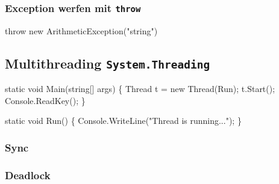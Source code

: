 \documentclass[
  9pt,
  a4paperpaper,
  DIV=11]{scrartcl}
\newenvironment{Shaded}{}{}
\newcommand{\DataTypeTok}[1]{\textcolor[rgb]{0.84,0.23,0.29}{#1}}
\newcommand{\FunctionTok}[1]{\textcolor[rgb]{0.44,0.26,0.76}{#1}}
\newcommand{\KeywordTok}[1]{\textcolor[rgb]{0.84,0.23,0.29}{#1}}
\newcommand{\NormalTok}[1]{\textcolor[rgb]{0.14,0.16,0.18}{#1}}
\newcommand{\OperatorTok}[1]{\textcolor[rgb]{0.14,0.16,0.18}{#1}}
\newcommand{\StringTok}[1]{\textcolor[rgb]{0.01,0.18,0.38}{#1}}
\numberwithin{equation}{section}
\begin{document}
\begin{multicols}{2}
\begin{tcolorbox}
\begin{tcolorbox}
\begin{tcolorbox}
\begin{tcolorbox}
\begin{tcolorbox}
\begin{tcolorbox}
\hypertarget{exception-werfen-mit-throw}{%
\subsubsection{\texorpdfstring{Exception werfen mit
\texttt{throw}}{Exception werfen mit throw}}\label{exception-werfen-mit-throw}}

\begin{Shaded}
\begin{Highlighting}[]
\KeywordTok{throw} \KeywordTok{new} \FunctionTok{ArithmeticException}\OperatorTok{(}\StringTok{"string"}\OperatorTok{)}
\end{Highlighting}
\end{Shaded}

\hypertarget{multithreading-system.threading}{%
\subsection{\texorpdfstring{Multithreading
\texttt{System.Threading}}{Multithreading System.Threading}}\label{multithreading-system.threading}}

\begin{Shaded}
\begin{Highlighting}[]
\KeywordTok{static} \DataTypeTok{void} \FunctionTok{Main}\OperatorTok{(}\DataTypeTok{string}\OperatorTok{[]}\NormalTok{ args}\OperatorTok{)} \OperatorTok{\{}
\NormalTok{  Thread t }\OperatorTok{=} \KeywordTok{new} \FunctionTok{Thread}\OperatorTok{(}\NormalTok{Run}\OperatorTok{);}
\NormalTok{  t}\OperatorTok{.}\FunctionTok{Start}\OperatorTok{();}
\NormalTok{  Console}\OperatorTok{.}\FunctionTok{ReadKey}\OperatorTok{();}
\OperatorTok{\}}

\KeywordTok{static} \DataTypeTok{void} \FunctionTok{Run}\OperatorTok{()} \OperatorTok{\{}
\NormalTok{  Console}\OperatorTok{.}\FunctionTok{WriteLine}\OperatorTok{(}\StringTok{"Thread is running..."}\OperatorTok{);}
\OperatorTok{\}}
\end{Highlighting}
\end{Shaded}

\hypertarget{sync}{%
\subsubsection{Sync}\label{sync}}

\hypertarget{deadlock}{%
\subsubsection{Deadlock}\label{deadlock}}


\end{tcolorbox}
\end{tcolorbox}
\end{tcolorbox}
\end{tcolorbox}
\end{tcolorbox}
\end{tcolorbox}
\end{multicols}
\end{document}
